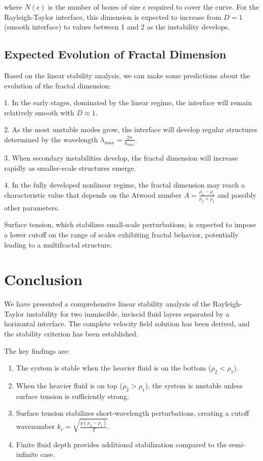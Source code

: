 \documentclass[12pt,a4paper]{article}
\begin{document}
where $N(\epsilon)$ is the number of boxes of size $\epsilon$ required to cover the curve. For the Rayleigh-Taylor interface, this dimension is expected to increase from $D = 1$ (smooth interface) to values between 1 and 2 as the instability develops.

\subsection{Expected Evolution of Fractal Dimension}
Based on the linear stability analysis, we can make some predictions about the evolution of the fractal dimension:

1. In the early stages, dominated by the linear regime, the interface will remain relatively smooth with $D \approx 1$.

2. As the most unstable modes grow, the interface will develop regular structures determined by the wavelength $\lambda_{max} = \frac{2\pi}{k_{max}}$.

3. When secondary instabilities develop, the fractal dimension will increase rapidly as smaller-scale structures emerge.

4. In the fully developed nonlinear regime, the fractal dimension may reach a characteristic value that depends on the Atwood number $A = \frac{\rho_2 - \rho_1}{\rho_2 + \rho_1}$ and possibly other parameters.

Surface tension, which stabilizes small-scale perturbations, is expected to impose a lower cutoff on the range of scales exhibiting fractal behavior, potentially leading to a multifractal structure.

\section{Conclusion}
We have presented a comprehensive linear stability analysis of the Rayleigh-Taylor instability for two immiscible, inviscid fluid layers separated by a horizontal interface. The complete velocity field solution has been derived, and the stability criterion has been established.

The key findings are:
\begin{enumerate}
    \item The system is stable when the heavier fluid is on the bottom ($\rho_2 < \rho_1$).
    \item When the heavier fluid is on top ($\rho_2 > \rho_1$), the system is unstable unless surface tension is sufficiently strong.
    \item Surface tension stabilizes short-wavelength perturbations, creating a cutoff wavenumber $k_c = \sqrt{\frac{g(\rho_2 - \rho_1)}{T}}$.
    \item Finite fluid depth provides additional stabilization compared to the semi-infinite case.
\end{enumerate}
\end{document}
